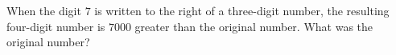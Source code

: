 When the digit $7$ is written to the right of a three-digit number, the resulting four-digit number is $7000$ greater than the original number. What was the original number?

